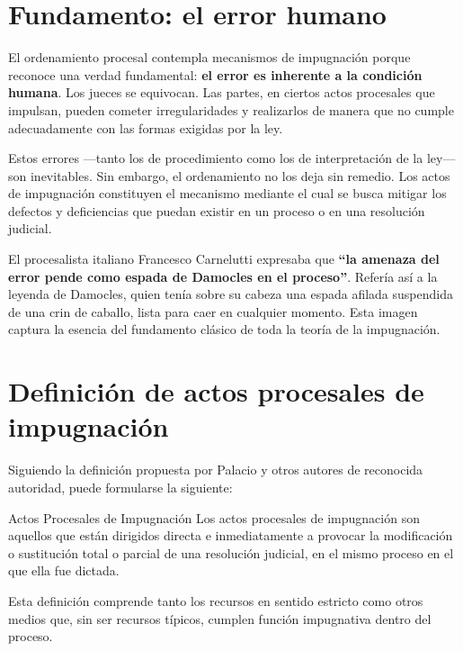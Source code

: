 \documentclass[12pt,oneside]{book}
\begin{document}
\section{Fundamento: el error humano}

El ordenamiento procesal contempla mecanismos de impugnación porque reconoce una verdad fundamental: \textbf{el error es inherente a la condición humana}. Los jueces se equivocan. Las partes, en ciertos actos procesales que impulsan, pueden cometer irregularidades y realizarlos de manera que no cumple adecuadamente con las formas exigidas por la ley.

Estos errores —tanto los de procedimiento como los de interpretación de la ley— son inevitables. Sin embargo, el ordenamiento no los deja sin remedio. Los actos de impugnación constituyen el mecanismo mediante el cual se busca mitigar los defectos y deficiencias que puedan existir en un proceso o en una resolución judicial.

El procesalista italiano Francesco Carnelutti expresaba que \textbf{``la amenaza del error pende como espada de Damocles en el proceso''}. Refería así a la leyenda de Damocles, quien tenía sobre su cabeza una espada afilada suspendida de una crin de caballo, lista para caer en cualquier momento. Esta imagen captura la esencia del fundamento clásico de toda la teoría de la impugnación.

\section{Definición de actos procesales de impugnación}

Siguiendo la definición propuesta por Palacio y otros autores de reconocida autoridad, puede formularse la siguiente:

\begin{definition}{Actos Procesales de Impugnación}
Los actos procesales de impugnación son aquellos que están dirigidos directa e inmediatamente a provocar la modificación o sustitución total o parcial de una resolución judicial, en el mismo proceso en el que ella fue dictada.
\end{definition}

Esta definición comprende tanto los recursos en sentido estricto como otros medios que, sin ser recursos típicos, cumplen función impugnativa dentro del proceso.

\end{document}
